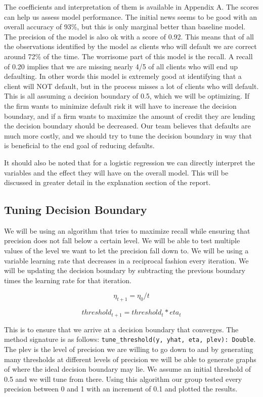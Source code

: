 \documentclass[12pt]{article}
\begin{document}
	The coefficients and interpretation of them is available in Appendix A. The scores can help us assess model performance. The initial news seems to be good with an overall accuracy of 93\%, but this is only marginal better than baseline model. The precision of the model is also ok with a score of 0.92. This means that of all the observations identified by the model as clients who will default we are correct around 72\% of the time. The worrisome part of this model is the recall. A recall of 0.20 implies that we are missing nearly 4/5 of all clients who will end up defaulting. In other words this model is extremely good at identifying that a client will NOT default, but in the process misses a lot of clients who will default. This is all assuming a decision boundary of 0.5, which we will be optimizing. If the firm wants to minimize default risk it will have to increase the decision boundary, and if a firm wants to maximize the amount of credit they are lending the decision boundary should be decreased. Our team believes that defaults are much more costly, and we should try to tune the decision boundary in  way that is beneficial to the end goal of reducing defaults. 
	
	It should also be noted that for a logistic regression we can directly interpret the variables and the effect they will have on the overall model. This will be discussed in greater detail in the explanation section of the report.

	\subsection{Tuning Decision Boundary}
	
	We will be using an algorithm that tries to maximize recall while ensuring that precision does not fall below a certain level. We will be able to test multiple values of the level we want to let the precision fall down to. We will be using a variable learning rate that decreases in a reciprocal fashion every iteration. We will be updating the decision boundary by subtracting the previous boundary times the learning rate for that iteration. 
	
	$$ \eta_{t+1} = \eta_0/t $$ 
	
	$$ threshold_{t+1} = threshold_t*eta_t $$
	
	This is to ensure that we arrive at a decision boundary that converges. The method signature is as follows: \verb|tune_threshold(y, yhat, eta, plev): Double|. The plev is the level of precision we are willing to go down to and by generating many thresholds at different levels of precision we will be able to generate graphs of where the ideal decision boundary may lie. We assume an initial threshold of 0.5 and we will tune from there. Using this algorithm our group tested every precision between 0 and 1 with an increment of 0.1 and plotted the results. 
	
\end{document}
